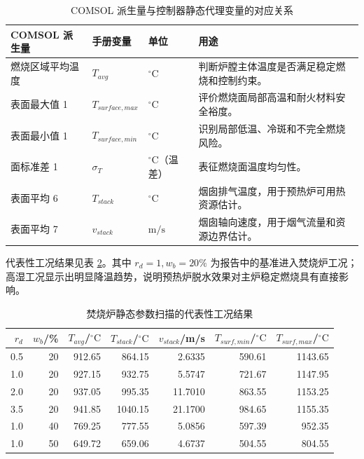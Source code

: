 \documentclass[UTF8,openany,zihao=-4,oneside]{ctexbook}
\begin{document}
\begin{table}[htbp]
\centering\small
\begin{tabularx}{\textwidth}{p{31mm}p{30mm}p{24mm}X}
\toprule
COMSOL 派生量 & 手册变量 & 单位 & 用途 \\
\midrule
燃烧区域平均温度 & $T_{avg}$ & $^\circ\mathrm{C}$ & 判断炉膛主体温度是否满足稳定燃烧和控制约束。\\
表面最大值 1 & $T_{surface,max}$ & $^\circ\mathrm{C}$ & 评价燃烧面局部高温和耐火材料安全裕度。\\
表面最小值 1 & $T_{surface,min}$ & $^\circ\mathrm{C}$ & 识别局部低温、冷斑和不完全燃烧风险。\\
面标准差 1 & $\sigma_T$ & $^\circ\mathrm{C}$（温差） & 表征燃烧面温度均匀性。\\
表面平均 6 & $T_{stack}$ & $^\circ\mathrm{C}$ & 烟囱排气温度，用于预热炉可用热资源估计。\\
表面平均 7 & $v_{stack}$ & $\mathrm{m/s}$ & 烟囱轴向速度，用于烟气流量和资源边界估计。\\
\bottomrule
\end{tabularx}
\caption{COMSOL 派生量与控制器静态代理变量的对应关系}
\label{tab:furnace-derived-values}
\end{table}

代表性工况结果见表 \ref{tab:furnace-static-representative}。其中 $r_d=1,w_b=20\%$ 为报告中的基准进入焚烧炉工况；高湿工况显示出明显降温趋势，说明预热炉脱水效果对主炉稳定燃烧具有直接影响。

\begin{table}[htbp]
\centering\small
\begin{tabular}{rrrrrrr}
\toprule
$r_d$ & $w_b$/\% & $T_{avg}$/\(^\circ\mathrm{C}\) & $T_{stack}$/\(^\circ\mathrm{C}\) & $v_{stack}$/m/s & $T_{surf,min}$/\(^\circ\mathrm{C}\) & $T_{surf,max}$/\(^\circ\mathrm{C}\) \\
\midrule
0.5 & 20 & 912.65 & 864.15 & 2.6335 & 590.61 & 1143.65 \\
1.0 & 20 & 927.15 & 932.75 & 5.5747 & 721.67 & 1147.95 \\
2.0 & 20 & 937.05 & 995.35 & 11.7010 & 863.55 & 1153.25 \\
3.5 & 20 & 941.85 & 1040.15 & 21.1700 & 984.65 & 1155.35 \\
1.0 & 40 & 769.25 & 777.55 & 5.0856 & 597.39 & 952.35 \\
1.0 & 50 & 649.72 & 659.06 & 4.6737 & 504.55 & 804.55 \\
\bottomrule
\end{tabular}
\caption{焚烧炉静态参数扫描的代表性工况结果}
\label{tab:furnace-static-representative}
\end{table}
\end{document}
